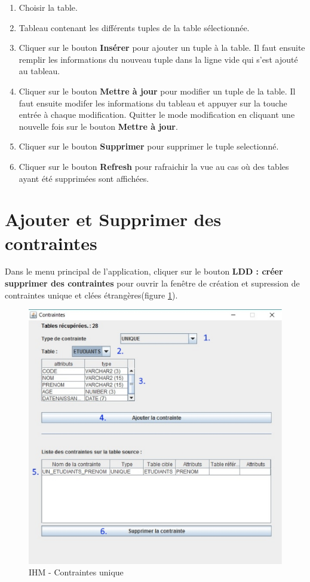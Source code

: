 \begin{enumerate}
\item Choisir la table.
\item Tableau contenant les différents tuples de la table sélectionnée.
\item Cliquer sur le bouton \textbf{Insérer} pour ajouter un tuple à la table. Il faut ensuite remplir les informations du nouveau tuple
dans la ligne vide qui s'est ajouté au tableau.
\item Cliquer sur le bouton \textbf{Mettre à jour} pour modifier un tuple de la table. Il faut ensuite modifer les informations du tableau et 
appuyer sur la touche entrée à chaque modification. Quitter le mode modification en cliquant une nouvelle fois sur le bouton \textbf{Mettre à jour}.
\item Cliquer sur le bouton \textbf{Supprimer} pour supprimer le tuple selectionné.
\item Cliquer sur le bouton \textbf{Refresh} pour rafraichir la vue au cas où des tables ayant été supprimées sont affichées.
\end{enumerate}

\section{Ajouter et Supprimer des contraintes}

Dans le menu principal de l'application, cliquer sur le bouton \textbf{LDD : créer supprimer des contraintes} pour ouvrir la fen\^etre de création et supression de contraintes unique et clées étrangères(figure \ref{contraintes_unique_gui}).

\begin{figure}[!h]
\centering
\includegraphics[width=12cm]{./images/manuel/contraintes_unique.eps}
\caption{IHM - Contraintes unique}
\label{contraintes_unique_gui}
\end{figure}

